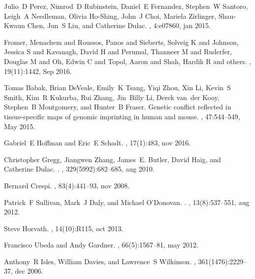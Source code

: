 \documentclass[letterpaper]{article}
\begin{document}
\begin{thebibliography}{10}
Julio~D Perez, Nimrod~D Rubinstein, Daniel~E Fernandez, Stephen~W Santoro,
  Leigh~A Needleman, Olivia Ho-Shing, John~J Choi, Mariela Zirlinger,
  Shau-Kwaun Chen, Jun~S Liu, and Catherine Dulac.
, 4:e07860, jan 2015.

Fromer, Menachem and Roussos, Panos and Sieberts, Solveig K and Johnson,
Jessica S and Kavanagh, David H and Perumal, Thanneer M and Ruderfer, Douglas
M and Oh, Edwin C and Topol, Aaron and Shah, Hardik R and others.
, 19(11):1442, Sep 2016.

Tomas Babak, Brian DeVeale, Emily~K Tsang, Yiqi Zhou, Xin Li, Kevin~S Smith,
  Kim~R Kukurba, Rui Zhang, Jin~Billy Li, Derek van~der Kooy, Stephen~B
  Montgomery, and Hunter~B Fraser.
\newblock Genetic conflict reflected in tissue-specific maps of genomic
  imprinting in human and mouse.
, 47:544--549, May 2015.

Gabriel~E Hoffman and Eric~E Schadt.
, 17(1):483, nov 2016.

Christopher Gregg, Jiangwen Zhang, James~E. Butler, David Haig, and Catherine
  Dulac.
.
, 329(5992):682--685, aug 2010.

Bernard Crespi.
,
  83(4):441--93, nov 2008.

Patrick~F Sullivan, Mark~J Daly, and Michael O'Donovan.
.
, 13(8):537--551, aug 2012.

Steve Horvath.
, 14(10):R115, oct 2013.

Francisco Ubeda and Andy Gardner.
,
  66(5):1567--81, may 2012.

Anthony~R Isles, William Davies, and Lawrence~S Wilkinson.
, 361(1476):2229--37, dec 2006.

\end{thebibliography}
\end{document}
